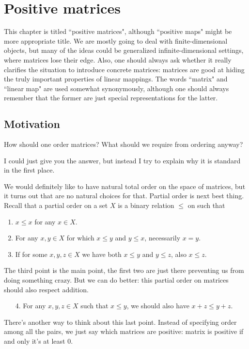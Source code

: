 \chapter{Positive matrices}

This chapter is titled ``positive matrices", although ``positive maps" might be more appropriate title. We are mostly going to deal with finite-dimensional objects, but many of the ideas could be generalized infinite-dimensional settings, where matrices lose their edge. Also, one should always ask whether it really clarifies the situation to introduce concrete matrices: matrices are good at hiding the truly important properties of linear mappings. The words ``matrix" and ``linear map" are used somewhat synonymously, although one should always remember that the former are just special representations for the latter.

\section{Motivation}

How should one order matrices? What should we require from ordering anyway?

I could just give you the answer, but instead I try to explain why it is standard in the first place.

We would definitely like to have natural total order on the space of matrices, but it turns out that are no natural choices for that. Partial order is next best thing. Recall that a partial order on a set $X$ is a binary relation $\leq$ on such that
\begin{enumerate}
	\item $x \leq x$ for any $x \in X$.
	\item For any $x, y \in X$ for which $x \leq y$ and $y \leq x$, necessarily $x = y$.
	\item If for some $x, y, z \in X$ we have both $x \leq y$ and $y \leq z$, also $x \leq z$.
\end{enumerate}

The third point is the main point, the first two are just there preventing us from doing something crazy. But we can do better: this partial order on matrices should also respect addition.
\begin{enumerate}
\item[4.] For any $x, y, z \in X$ such that $x \leq y$, we should also have $x + z \leq y + z$.
\end{enumerate}

There's another way to think about this last point. Instead of specifying order among all the pairs, we just say which matrices are positive: matrix is positive if and only it's at least $0$.

